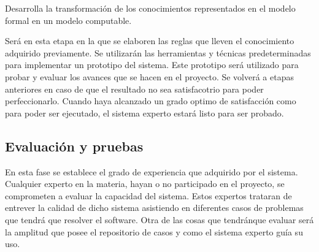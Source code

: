 Desarrolla la transformación de los conocimientos representados en el modelo formal
 en un modelo computable.

Será en esta etapa en la que se elaboren las reglas que lleven el conocimiento adquirido
 previamente. Se utilizarán las herramientas y técnicas predeterminadas para implementar
 un prototipo del sistema. Este prototipo será utilizado para probar y evaluar los avances
 que se hacen en el proyecto. Se volverá a etapas anteriores en caso de que el resultado
 no sea satisfacotrio para poder perfeccionarlo. Cuando haya alcanzado un grado optimo
 de satisfacción como para poder ser ejecutado, el sistema experto estará listo para ser probado.




\subsection{Evaluación y pruebas}

En esta fase se establece el grado de experiencia que adquirido por el sistema. Cualquier
 experto en la materia, hayan o no participado en el proyecto, se comprometen a evaluar
 la capacidad del sistema. Estos expertos trataran de entrever la calidad de dicho sistema
 asistiendo en diferentes casos de problemas que tendrá que resolver el software. Otra de
 las cosas que tendránque evaluar será la amplitud que posee el repositorio de casos y como
 el sistema experto guía su uso.


